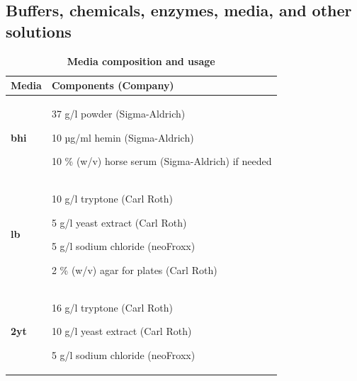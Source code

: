 \subsection{Buffers, chemicals, enzymes, media, and other solutions}
\begin{table}[H]
        \caption{\textbf{Media composition and usage}}
        \label{tab:media_composition}
        \begin{tabular}{|Y{5.6cm}|L{9cm}|}
          \hline
           \textbf{Media}   & \textbf{Components} (Company)  \\ 
            \hline
            \textbf{\Gls{bhi}}     
                & \vspace{2mm}
                37 g/l  powder  (Sigma-Aldrich)     \par \vspace{2mm}
                10 µg/ml  hemin (Sigma-Aldrich)                     \par \vspace{2mm}
                10 \% (w/v) horse serum (Sigma-Aldrich) if needed \vspace{2mm} \\
           
           \textbf{\Gls{lb}} \par \parencite{bertani_studies_1951}    
                &\vspace{2mm}
                10 g/l tryptone  (Carl Roth)              \par \vspace{2mm}
                5 g/l yeast extract  (Carl Roth)          \par \vspace{2mm}
                5 g/l sodium chloride  (neoFroxx)         \par \vspace{2mm}
                2 \% (w/v) agar for plates  (Carl Roth)         \vspace{2mm}\\ 
        
           \textbf{\gls{2yt}}    
                & \vspace{2mm}
                 16 g/l tryptone  (Carl Roth)              \par \vspace{2mm}
                 10 g/l yeast extract  (Carl Roth)         \par \vspace{2mm}
                 5 g/l sodium chloride  (neoFroxx)              \vspace{2mm} \\      
            \hline
        \end{tabular}
\end{table}
